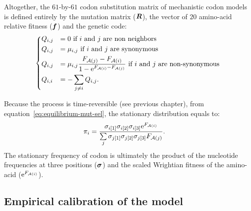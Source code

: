 Altogether, the $61$-by-$61$ codon substitution matrix of mechanistic codon models is defined entirely by the mutation matrix ($\bm{R}$), the vector of $20$ amino-acid relative fitness ($\bm{f}$) and the genetic code:
\begin{equation}
    \begin{dcases}
        Q_{{i}, {j}} & = 0 \text{ if ${i}$ and ${j}$ are non neighbors} \\
        Q_{{i}, {j}} & = \mu_{{i}, {j}} \text{ if ${i}$ and ${j}$ are synonymous} \\
        Q_{{i}, {j}} & = \mu_{{i}, {j}} \dfrac{F_{\mathcal{A}({j})} - F_{\mathcal{A}({i})}}{1 - \mathrm{e}^{F_{\mathcal{A}({i})} - F_{\mathcal{A}({j})}} } \text{ if ${i}$ and ${j}$ are non-synonymous} \\
        Q_{{i}, {i}} & = - \sum\limits_{{j} \neq {i}} Q_{{i}, {j}}.
    \end{dcases}
    \label{eq:propensities-models}
\end{equation}

Because the process is time-reversible (see previous chapter), from equation~\ref{eq:equilibrium-mut-sel}, the stationary distribution equals to:
\begin{align}
    \pi_{{i}} & = \dfrac{\sigma_{{i}[1]}\sigma_{{i}[2]}\sigma_{{i}[3]}\mathrm{e}^{F_{\mathcal{A}({i})}}}{\sum\limits_{{j}}\sigma_{{j}[1]}\sigma_{{j}[2]}\sigma_{{j}[3]}F_{\mathcal{A}({j})} }.
\end{align}
The stationary frequency of codon is ultimately the product of the nucleotide frequencies at three positions ($\bm{\sigma}$) and the scaled Wrightian fitness of the amino-acid ($\mathrm{e}^{F_{\mathcal{A}({i})}}$).

\subsection{Empirical calibration of the model}
\label{subsec:empirical-calibration-HB}

